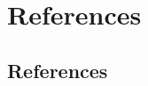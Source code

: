 \section{References}
\begin{thebibliography}{99}

\subsection*{References}





\end{thebibliography}
